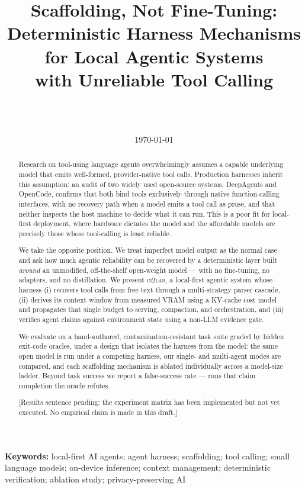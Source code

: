 \documentclass[11pt,a4paper]{article}
\title{\textbf{Scaffolding, Not Fine-Tuning:\\
Deterministic Harness Mechanisms for Local Agentic Systems\\
with Unreliable Tool Calling}}
\author{%
  \note{author list} \\
  \note{affiliation} \\
  \texttt{\note{contact}}
}
\date{\today}
\newcommand{\note}[1]{\textcolor{red!70!black}{\small\textsf{[#1]}}}
\begin{document}
\maketitle

\begin{abstract}
Research on tool-using language agents overwhelmingly assumes a capable
underlying model that emits well-formed, provider-native tool calls. Production
harnesses inherit this assumption: an audit of two widely used open-source
systems, DeepAgents and OpenCode, confirms that both bind tools exclusively
through native function-calling interfaces, with no recovery path when a model
emits a tool call as prose, and that neither inspects the host machine to decide
what it can run. This is a poor fit for local-first deployment, where hardware
dictates the model and the affordable models are precisely those whose
tool-calling is least reliable.

We take the opposite position. We treat imperfect model output as the normal
case and ask how much agentic reliability can be recovered by a deterministic
layer built \emph{around} an unmodified, off-the-shelf open-weight model --- with
no fine-tuning, no adapters, and no distillation. We present \textsc{ci2lab}, a
local-first agentic system whose harness (i) recovers tool calls from free text
through a multi-strategy parser cascade, (ii) derives its context window from
measured VRAM using a KV-cache cost model and propagates that single budget to
serving, compaction, and orchestration, and (iii) verifies agent claims against
environment state using a non-LLM evidence gate.

We evaluate on a hand-authored, contamination-resistant task suite graded by
hidden exit-code oracles, under a design that isolates the harness from the
model: the same open model is run under a competing harness, our single- and
multi-agent modes are compared, and each scaffolding mechanism is ablated
individually across a model-size ladder. Beyond task success we report a
false-success rate --- runs that claim completion the oracle refutes.

\note{Results sentence pending: the experiment matrix has been implemented but
not yet executed. No empirical claim is made in this draft.}
\end{abstract}

\medskip
\noindent\textbf{Keywords:} local-first AI agents; agent harness; scaffolding;
tool calling; small language models; on-device inference; context management;
deterministic verification; ablation study; privacy-preserving AI
\end{document}
